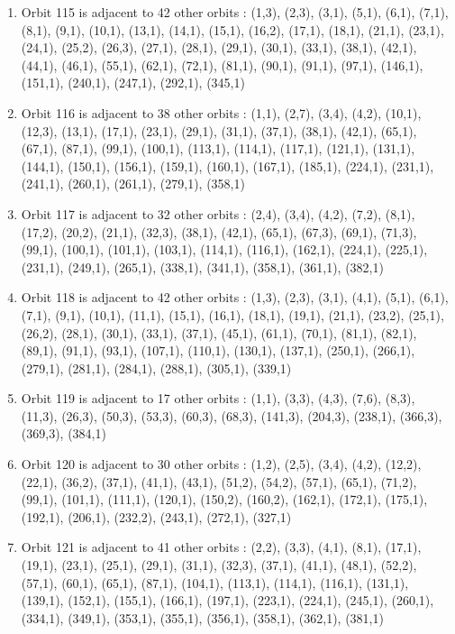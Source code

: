 \documentclass[12pt]{article}
\begin{document}
\begin{enumerate}
\item Orbit 115 is adjacent to 42 other orbits : (1,3), (2,3), (3,1), (5,1), (6,1), (7,1), (8,1), (9,1), (10,1), (13,1), (14,1), (15,1), (16,2), (17,1), (18,1), (21,1), (23,1), (24,1), (25,2), (26,3), (27,1), (28,1), (29,1), (30,1), (33,1), (38,1), (42,1), (44,1), (46,1), (55,1), (62,1), (72,1), (81,1), (90,1), (91,1), (97,1), (146,1), (151,1), (240,1), (247,1), (292,1), (345,1)
\item Orbit 116 is adjacent to 38 other orbits : (1,1), (2,7), (3,4), (4,2), (10,1), (12,3), (13,1), (17,1), (23,1), (29,1), (31,1), (37,1), (38,1), (42,1), (65,1), (67,1), (87,1), (99,1), (100,1), (113,1), (114,1), (117,1), (121,1), (131,1), (144,1), (150,1), (156,1), (159,1), (160,1), (167,1), (185,1), (224,1), (231,1), (241,1), (260,1), (261,1), (279,1), (358,1)
\item Orbit 117 is adjacent to 32 other orbits : (2,4), (3,4), (4,2), (7,2), (8,1), (17,2), (20,2), (21,1), (32,3), (38,1), (42,1), (65,1), (67,3), (69,1), (71,3), (99,1), (100,1), (101,1), (103,1), (114,1), (116,1), (162,1), (224,1), (225,1), (231,1), (249,1), (265,1), (338,1), (341,1), (358,1), (361,1), (382,1)
\item Orbit 118 is adjacent to 42 other orbits : (1,3), (2,3), (3,1), (4,1), (5,1), (6,1), (7,1), (9,1), (10,1), (11,1), (15,1), (16,1), (18,1), (19,1), (21,1), (23,2), (25,1), (26,2), (28,1), (30,1), (33,1), (37,1), (45,1), (61,1), (70,1), (81,1), (82,1), (89,1), (91,1), (93,1), (107,1), (110,1), (130,1), (137,1), (250,1), (266,1), (279,1), (281,1), (284,1), (288,1), (305,1), (339,1)
\item Orbit 119 is adjacent to 17 other orbits : (1,1), (3,3), (4,3), (7,6), (8,3), (11,3), (26,3), (50,3), (53,3), (60,3), (68,3), (141,3), (204,3), (238,1), (366,3), (369,3), (384,1)
\item Orbit 120 is adjacent to 30 other orbits : (1,2), (2,5), (3,4), (4,2), (12,2), (22,1), (36,2), (37,1), (41,1), (43,1), (51,2), (54,2), (57,1), (65,1), (71,2), (99,1), (101,1), (111,1), (120,1), (150,2), (160,2), (162,1), (172,1), (175,1), (192,1), (206,1), (232,2), (243,1), (272,1), (327,1)
\item Orbit 121 is adjacent to 41 other orbits : (2,2), (3,3), (4,1), (8,1), (17,1), (19,1), (23,1), (25,1), (29,1), (31,1), (32,3), (37,1), (41,1), (48,1), (52,2), (57,1), (60,1), (65,1), (87,1), (104,1), (113,1), (114,1), (116,1), (131,1), (139,1), (152,1), (155,1), (166,1), (197,1), (223,1), (224,1), (245,1), (260,1), (334,1), (349,1), (353,1), (355,1), (356,1), (358,1), (362,1), (381,1)

\end{enumerate}
\end{document}
